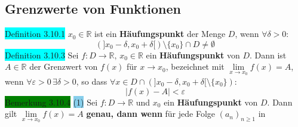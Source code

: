 \documentclass[landscape, 10pt]{article}
\newcommand{\R}{\mathbb{R}}
\begin{document}
\begin{multicols}{3}
       \subsection{Grenzwerte von Funktionen}
              \colorbox{cyan}{Definition 3.10.1}
                     \textcolor{NavyBlue}{$x_0\in\R$} 
                     ist ein \textbf{Häufungspunkt} 
                     der Menge \textcolor{NavyBlue}{$D$}, 
                     wenn \textcolor{NavyBlue}{
                     $\forall\delta>0$}:
                     \begin{equation*}
                            (]x_0-\delta,x_0+\delta[)
                            \setminus\{x_0\}\cap D\neq\emptyset  
                     \end{equation*}
              \colorbox{cyan}{Definition 3.10.3}
                     Sei \textcolor{NavyBlue}{
                     $f:D\longrightarrow\R,\,x_0\in\R$}
                     ein \textbf{Häufungspunkt} von 
                     \textcolor{NavyBlue}{$D$}.
                     Dann ist \textcolor{NavyBlue}{$A\in\R$} 
                     der Grenzwert von 
                     \textcolor{NavyBlue}{$f(x)$} für 
                     \textcolor{NavyBlue}{$x\to x_0$}, 
                     bezeichnet mit 
                     \textcolor{NavyBlue}{
                     $\lim\limits_{x\to x_0}f(x)=A$}, 
                     wenn \textcolor{NavyBlue}{
                     $\forall\varepsilon>0\,\exists\delta>0$}, 
                     so dass 
                     \textcolor{NavyBlue}{
                     $\forall x\in 
                     D\cap(]x_0-\delta,x_0+\delta[
                     \setminus\{x_0\})$}:
                     \begin{equation*}
                            |f(x)-A|<\varepsilon
                     \end{equation*}
              \colorbox{green}{Bemerkung 3.10.4} 
                     \colorbox{SkyBlue}{(1)} Sei 
                     \textcolor{NavyBlue}{
                            $f:D\longrightarrow\R$} und 
                            \textcolor{NavyBlue}{$x_0$} ein 
                            \textbf{Häufungspunkt} von $D$. 
                            Dann gilt 
                            \textcolor{NavyBlue}{
                            $\lim\limits_{x\to x_0}f(x)=A$} 
                            \textbf{genau, dann wenn} für 
                            jede Folge 
                            \textcolor{NavyBlue}{
                            $(a_n)_{n\geqslant1}$} 
                            in \textcolor{NavyBlue}{
}
\end{multicols}
\end{document}
